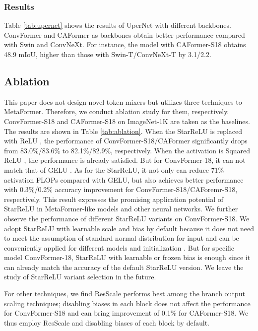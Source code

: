 \subsubsection{Results}

Table \ref{tab:upernet} shows the results of UperNet with different backbones. ConvFormer and CAFormer as backbones obtain better performance compared with Swin and ConvNeXt. For instance, the model with CAFormer-S18 obtains 48.9 mIoU, higher than those with Swin-T/ConvNeXt-T by 3.1/2.2. 


\subsection{Ablation}
\label{sec:ablation}
This paper does not design novel token mixers but utilizes three techniques to MetaFormer. Therefore, we conduct ablation study for them, respectively. ConvFormer-S18 and CAFormer-S18 on ImageNet-1K are taken as the baselines. The results are shown in Table \ref{tab:ablation}. When the StarReLU is replaced with ReLU \cite{relu}, the performance of ConvFormer-S18/CAFormer significantly drops from 83.0\%/83.6\% to 82.1\%/82.9\%, respectively. When the activation is Squared ReLU \cite{so2021primer}, the performance is already satisfied. But for ConvFormer-18, it can not match that of GELU \cite{gelu}. As for the StarReLU, it not only can reduce 71\% activation FLOPs compared with GELU, but also achieves better performance with 0.3\%/0.2\% accuracy improvement for ConvFormer-S18/CAForemr-S18, respectively. This result expresses the promising application potential of StarReLU in MetaFormer-like models and other neural networks. We further observe the performance of different StarReLU variants on ConvFormer-S18. We adopt StarReLU with learnable scale and bias by default because it does not need to meet the assumption of standard normal distribution for input \cite{klambauer2017self} and can be conveniently applied for different models and initialization \cite{he2015delving, chen2020dynamic}. But for specific model ConvFormer-18, StarReLU with learnable or frozen bias is enough since it can already match the accuracy of the default StarReLU version. We leave the study of StarReLU variant selection in the future.

For other techniques, we find ResScale \cite{shleifer2021normformer} performs best among the branch output scaling techniques; disabling biases \cite{raffel2020exploring, chowdhery2022palm} in each block does not affect the performance for ConvFormer-S18 and can bring improvement of 0.1\% for CAFormer-S18. We thus employ ResScale and disabling biases of each block by default.





